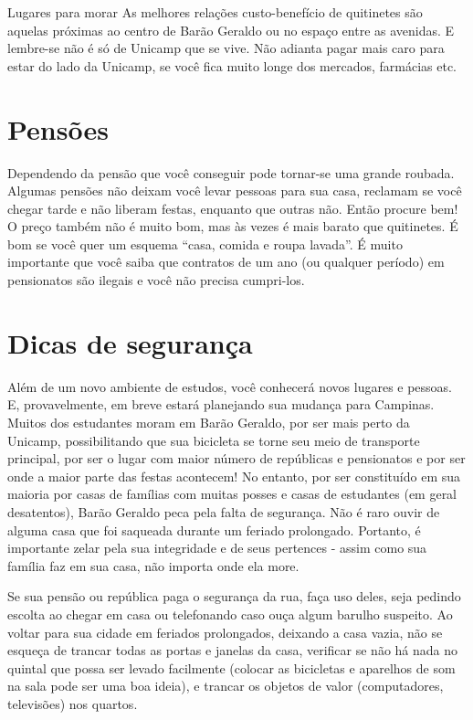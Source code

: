 \begin{story}{Lugares para morar}
As melhores relações custo-benefício de quitinetes são aquelas próximas ao centro de Barão Geraldo ou no espaço entre as avenidas. E lembre-se não é só de Unicamp que se vive. Não adianta pagar mais caro para estar do lado da Unicamp, se você fica muito longe dos mercados, farmácias etc.

\section*{Pensões}

Dependendo da pensão que você conseguir pode tornar-se uma grande roubada. Algumas pensões não deixam você levar pessoas para sua casa, reclamam se você chegar tarde e não liberam festas, enquanto que outras não. Então procure bem! O preço também não é muito bom, mas às vezes é mais barato que quitinetes. É bom se você quer um esquema ``casa, comida e roupa lavada''. É muito importante que você saiba que contratos de um ano (ou qualquer período) em pensionatos são ilegais e você não precisa cumpri-los.

\section*{Dicas de segurança}

Além de um novo ambiente de estudos, você conhecerá novos lugares e pessoas. E, provavelmente, em breve estará planejando sua mudança para Campinas. Muitos dos estudantes moram em Barão Geraldo, por ser mais perto da Unicamp, possibilitando que sua bicicleta se torne seu meio de transporte principal, por ser o lugar com maior número de repúblicas e pensionatos e por ser onde a maior parte das festas acontecem! No entanto, por ser constituído em sua maioria por casas de famílias com muitas posses e casas de estudantes (em geral desatentos), Barão Geraldo peca pela falta de segurança. Não é raro ouvir de alguma casa que foi saqueada durante um feriado prolongado. Portanto, é importante zelar pela sua integridade e de seus pertences - assim como sua família faz em sua casa, não importa onde ela more.

Se sua pensão ou república paga o segurança da rua, faça uso deles, seja pedindo escolta ao chegar em casa ou telefonando caso ouça algum barulho suspeito. Ao voltar para sua cidade em feriados prolongados, deixando a casa vazia, não se esqueça de trancar todas as portas e janelas da casa, verificar se não há nada no quintal que possa ser levado facilmente (colocar as bicicletas e aparelhos de som na sala pode ser uma boa ideia), e trancar os objetos de valor (computadores, televisões) nos quartos.


\end{story}
